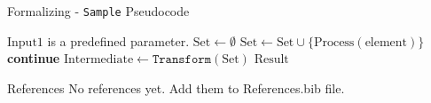 \documentclass{beamer}
\begin{document}
\begin{frame}[label=pseudocode1]{Formalizing - \texttt{Sample} Pseudocode \hyperlink{process1}{}}
    \begin{algorithm}[H]
        \small
        \caption{$(\text{Result}) \gets \texttt{Sample}(\text{Input1})$}
        \label{alg:pseudocode1}
        \begin{algorithmic}[1]
            \Require $\text{Input1}$ is a predefined parameter.
            \State $\text{Set} \gets \emptyset$
            \State $\text{Set} \gets \text{Set} \cup \{\text{Process}(\text{element})\}$
            \Else
            \State \textbf{continue}
            \EndIf
            \EndFor
            \State $\text{Intermediate} \gets \texttt{Transform}(\text{Set})$
            \State \Return $\text{Result}$
        \end{algorithmic}
    \end{algorithm}
    \note{}
\end{frame}

\begin{frame}{References}
    No references yet. Add them to References.bib file.
\end{frame}
                    
\end{document}
